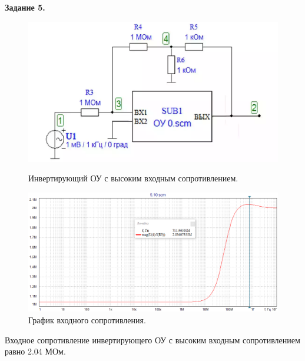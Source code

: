 \documentclass[a4paper,14pt]{extarticle}
\begin{document}
    \newpage
    \begin{center}
        \textbf{Задание 5.}
    \end{center}
    \begin{figure}[h!]
        \begin{center}
            \includegraphics[scale=0.4]{11.png}
        \end{center}
        \caption{Инвертирующий ОУ с высоким входным сопротивлением.}
        \begin{center}
            \includegraphics[scale=0.5]{12.png}
        \end{center}
        \caption{График входного сопротивления.}
        \vspace{-0.7cm}
    \end{figure}

    Входное сопротивление инвертирующего ОУ с высоким входным сопротивлением равно 2.04 МОм.
\end{document}
